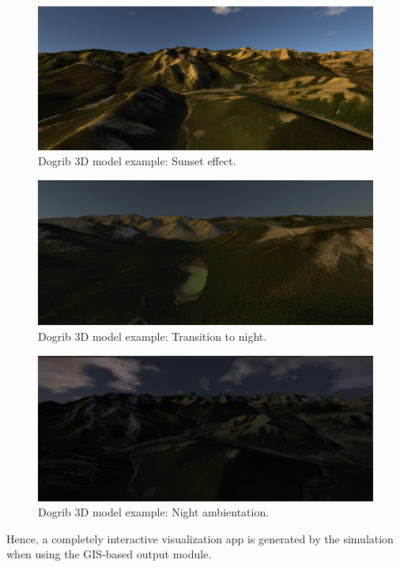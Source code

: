 \documentclass[11pt]{article}
\begin{document}
\begin{figure}[h!]
\centering
\includegraphics[scale=0.4]{Dogrib3D_5.png}
\caption{\label{fig:Dog5}Dogrib 3D model example: Sunset effect.}
\end{figure}

\newpage

\begin{figure}[h!]
\centering
\includegraphics[scale=0.4]{Dogrib3D_6.png}
\caption{\label{fig:Dog6}Dogrib 3D model example: Transition to night.}
\end{figure}

\begin{figure}[h!]
\centering
\includegraphics[scale=0.4]{Dogrib3D_7.png}
\caption{\label{fig:Dog7}Dogrib 3D model example: Night ambientation.}
\end{figure}

Hence, a completely interactive visualization app is generated by the simulation when using the GIS-based output module.
\end{document}
